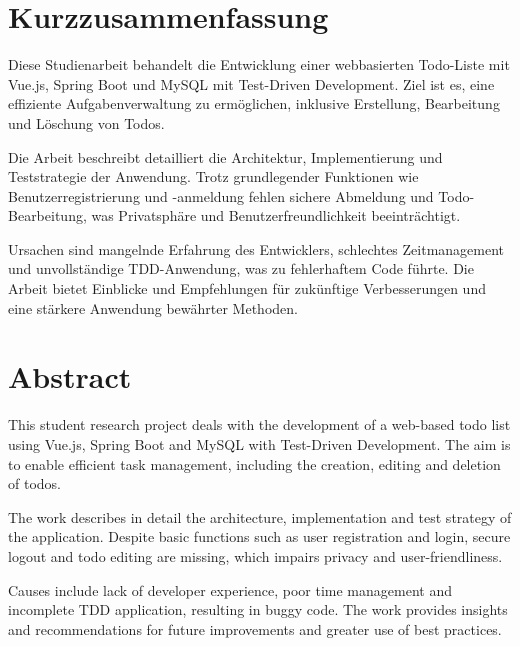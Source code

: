 \section*{Kurzzusammenfassung}

Diese Studienarbeit behandelt die Entwicklung einer webbasierten Todo-Liste mit Vue.js, Spring Boot und MySQL mit Test-Driven Development. Ziel ist es, eine effiziente Aufgabenverwaltung zu ermöglichen, inklusive Erstellung, Bearbeitung und Löschung von Todos.

Die Arbeit beschreibt detailliert die Architektur, Implementierung und Teststrategie der Anwendung. Trotz grundlegender Funktionen wie Benutzerregistrierung und -anmeldung fehlen sichere Abmeldung und Todo-Bearbeitung, was Privatsphäre und Benutzerfreundlichkeit beeinträchtigt.

Ursachen sind mangelnde Erfahrung des Entwicklers, schlechtes Zeitmanagement und unvollständige TDD-Anwendung, was zu fehlerhaftem Code führte. Die Arbeit bietet Einblicke und Empfehlungen für zukünftige Verbesserungen und eine stärkere Anwendung bewährter Methoden.

\section*{Abstract}

This student research project deals with the development of a web-based todo list using Vue.js, Spring Boot and MySQL with Test-Driven Development. The aim is to enable efficient task management, including the creation, editing and deletion of todos.

The work describes in detail the architecture, implementation and test strategy of the application. Despite basic functions such as user registration and login, secure logout and todo editing are missing, which impairs privacy and user-friendliness.

Causes include lack of developer experience, poor time management and incomplete TDD application, resulting in buggy code. The work provides insights and recommendations for future improvements and greater use of best practices.




